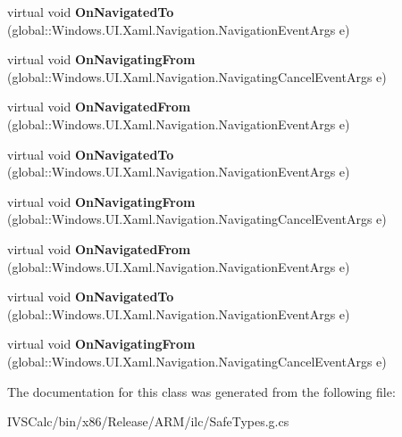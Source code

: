 \begin{DoxyCompactItemize}
\item 
\mbox{\label{class_windows_1_1_u_i_1_1_xaml_1_1_controls_1_1_page_af4fc4f6a9eac8ff3516e646626d6a742}} 
virtual void {\bfseries On\+Navigated\+To} (global\+::\+Windows.\+U\+I.\+Xaml.\+Navigation.\+Navigation\+Event\+Args e)
\item 
\mbox{\label{class_windows_1_1_u_i_1_1_xaml_1_1_controls_1_1_page_acc18e64ca5ff3650ce4467a152c21f1a}} 
virtual void {\bfseries On\+Navigating\+From} (global\+::\+Windows.\+U\+I.\+Xaml.\+Navigation.\+Navigating\+Cancel\+Event\+Args e)
\item 
\mbox{\label{class_windows_1_1_u_i_1_1_xaml_1_1_controls_1_1_page_a981a7d0a48be93271a0990797a1ad7b2}} 
virtual void {\bfseries On\+Navigated\+From} (global\+::\+Windows.\+U\+I.\+Xaml.\+Navigation.\+Navigation\+Event\+Args e)
\item 
\mbox{\label{class_windows_1_1_u_i_1_1_xaml_1_1_controls_1_1_page_af4fc4f6a9eac8ff3516e646626d6a742}} 
virtual void {\bfseries On\+Navigated\+To} (global\+::\+Windows.\+U\+I.\+Xaml.\+Navigation.\+Navigation\+Event\+Args e)
\item 
\mbox{\label{class_windows_1_1_u_i_1_1_xaml_1_1_controls_1_1_page_acc18e64ca5ff3650ce4467a152c21f1a}} 
virtual void {\bfseries On\+Navigating\+From} (global\+::\+Windows.\+U\+I.\+Xaml.\+Navigation.\+Navigating\+Cancel\+Event\+Args e)
\item 
\mbox{\label{class_windows_1_1_u_i_1_1_xaml_1_1_controls_1_1_page_a981a7d0a48be93271a0990797a1ad7b2}} 
virtual void {\bfseries On\+Navigated\+From} (global\+::\+Windows.\+U\+I.\+Xaml.\+Navigation.\+Navigation\+Event\+Args e)
\item 
\mbox{\label{class_windows_1_1_u_i_1_1_xaml_1_1_controls_1_1_page_af4fc4f6a9eac8ff3516e646626d6a742}} 
virtual void {\bfseries On\+Navigated\+To} (global\+::\+Windows.\+U\+I.\+Xaml.\+Navigation.\+Navigation\+Event\+Args e)
\item 
\mbox{\label{class_windows_1_1_u_i_1_1_xaml_1_1_controls_1_1_page_acc18e64ca5ff3650ce4467a152c21f1a}} 
virtual void {\bfseries On\+Navigating\+From} (global\+::\+Windows.\+U\+I.\+Xaml.\+Navigation.\+Navigating\+Cancel\+Event\+Args e)
\end{DoxyCompactItemize}


The documentation for this class was generated from the following file\+:\begin{DoxyCompactItemize}
\item 
I\+V\+S\+Calc/bin/x86/\+Release/\+A\+R\+M/ilc/Safe\+Types.\+g.\+cs\end{DoxyCompactItemize}
